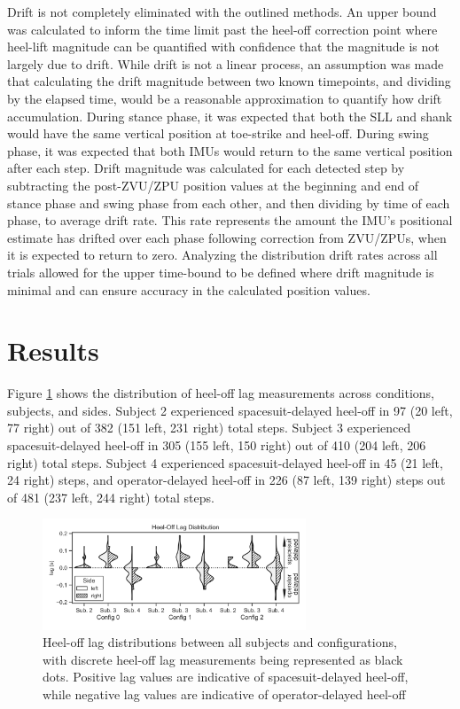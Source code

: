 \documentclass[defaultstyle,11pt]{comps}
\begin{document}
Drift is not completely eliminated with the outlined methods.
An upper bound was calculated to inform the time limit past the heel-off correction point where heel-lift magnitude can be quantified with confidence that the magnitude is not largely due to drift.
While drift is not a linear process, an assumption was made that calculating the drift magnitude between two known timepoints, and dividing by the elapsed time, would be a reasonable approximation to quantify how drift accumulation.
During stance phase, it was expected that both the SLL and shank would have the same vertical position at toe-strike and heel-off.
During swing phase, it was expected that both IMUs would return to the same vertical position after each step.
Drift magnitude was calculated for each detected step by subtracting the post-ZVU/ZPU position values at the beginning and end of stance phase and swing phase from each other, and then dividing by time of each phase, to average drift rate.
This rate represents the amount the IMU's positional estimate has drifted over each phase following correction from ZVU/ZPUs, when it is expected to return to zero.
Analyzing the distribution drift rates across all trials allowed for the upper time-bound to be defined where drift magnitude is minimal and can ensure accuracy in the calculated position values.

\hypertarget{results}{%
\section{Results}\label{results}}

Figure \ref{fig:SA1-Lag} shows the distribution of heel-off lag measurements across conditions, subjects, and sides.
Subject 2 experienced spacesuit-delayed heel-off in 97 (20 left, 77 right) out of 382 (151 left, 231 right) total steps.
Subject 3 experienced spacesuit-delayed heel-off in 305 (155 left, 150 right) out of 410 (204 left, 206 right) total steps.
Subject 4 experienced spacesuit-delayed heel-off in 45 (21 left, 24 right) steps, and operator-delayed heel-off in 226 (87 left, 139 right) steps out of 481 (237 left, 244 right) total steps.

\begin{figure}
\hypertarget{fig:SA1-Lag}{%
\centering
\includegraphics[width=0.7\textwidth,height=\textheight]{../fig/SA1/heelOffLag.png}
\caption{Heel-off lag distributions between all subjects and configurations, with discrete heel-off lag measurements being represented as black dots. Positive lag values are indicative of spacesuit-delayed heel-off, while negative lag values are indicative of operator-delayed heel-off}\label{fig:SA1-Lag}
}
\end{figure}
\end{document}
